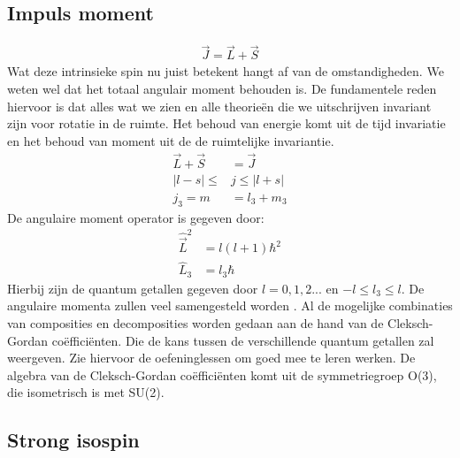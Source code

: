 \documentclass[../main.tex]{subfiles}
\begin{document}
\subsection{Impuls moment}%
\label{sub:impuls_moment}

\begin{equation}
    \begin{aligned}
        \label{eq:impuls_moment}
        \vec{J}=\vec{L}+\vec{S}
    \end{aligned}
\end{equation}
Wat deze intrinsieke spin nu juist betekent hangt af van de omstandigheden. We weten wel dat het totaal angulair moment behouden is. De fundamentele reden hiervoor is dat alles wat we zien en alle theorieën die we uitschrijven invariant zijn voor rotatie in de ruimte. Het behoud van energie komt uit de tijd invariatie en het behoud van moment uit de de ruimtelijke invariantie.\\
\begin{equation}
    \begin{aligned}
        \label{eq:samengesteld_moment}
        \vec{L} + \vec{S} &= \vec{J}\\
        |l-s| \leq &j \leq |l+s|\\
        j_3=m&=l_3+m_3
    \end{aligned}
\end{equation}
De angulaire moment operator is gegeven door:
\begin{equation}
    \begin{aligned}
        \label{eq:ang_mom_op}
        \hat{\vec{L}}^2&=l(l+1)\hbar^2\\
        \hat{L}_3&=l_3\hbar
    \end{aligned}
\end{equation}
Hierbij zijn de quantum getallen gegeven door $l=0,1,2...$ en $-l\leq l_3\leq l$. De angulaire momenta zullen veel samengesteld worden . Al de mogelijke combinaties van composities en decomposities worden gedaan aan de hand van de Cleksch-Gordan coëfficiënten. Die de kans tussen de verschillende quantum getallen zal weergeven. Zie hiervoor de oefeninglessen om goed mee te leren werken. De algebra van de Cleksch-Gordan coëfficiënten komt uit de symmetriegroep O(3), die isometrisch is met SU(2). 

\subsection{Strong isospin}%
\label{sub:strong_isospin}
\end{document}
